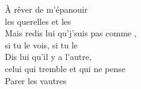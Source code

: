 À rêver de m'épanouir  \\
les querelles et les  \\
Mais redis lui qu'j'suis pas comme , \\
si tu le vois, si tu le  \\
Dis lui qu'il y a l'autre,\songwordfb{}\\
celui qui tremble et qui ne pense  \\
Parer les vautres \\